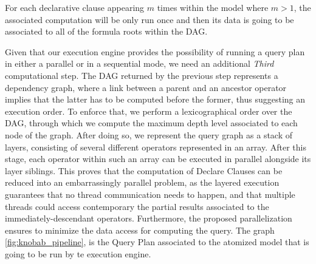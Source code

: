 For each declarative clause appearing $m$ times within the model where $m>1$, the associated computation will be only run once and then its data is going to be associated to all of the \xLTLf formula roots within the DAG. %

Given that our execution engine provides the possibility of running a query plan in either a parallel or in a sequential mode, we need   an additional \textit{Third} computational step. The DAG returned by the previous step represents a dependency graph, where a link between a parent and an ancestor operator implies that the latter has to be computed before the former, thus suggesting an execution order. To enforce that, we perform a lexicographical order over the DAG, through which we compute the maximum depth level associated to each node of the graph. After doing so, we represent the query graph as a stack of layers, consisting of several different operators represented in an array. After this stage, each operator within such an array can be executed in parallel alongside its layer siblings. This proves that the computation of Declare Clauses can be reduced into an embarrassingly parallel problem, as the layered execution guarantees that no thread communication needs to happen, and that multiple threads could access contemporary the partial results associated to the immediately-descendant operators. Furthermore, the proposed parallelization ensures to minimize the data access for computing the query. The graph \figurename\ref{fig:knobab_pipeline}, is the Query Plan associated to the atomized model that is going to be run by te execution engine.
